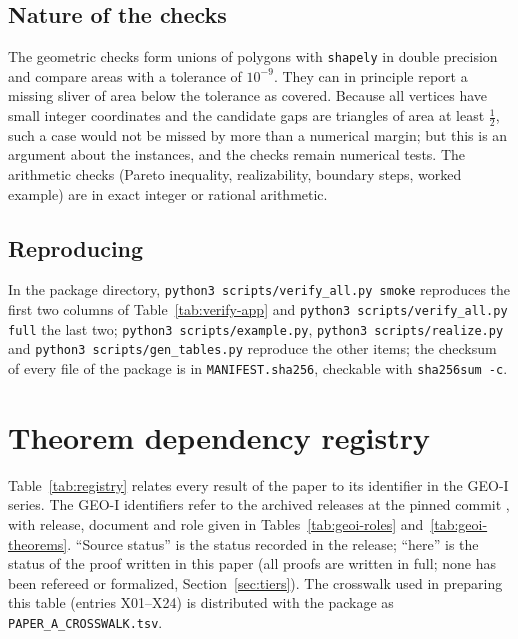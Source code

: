 \subsection{Nature of the checks}

The geometric checks form unions of polygons with \texttt{shapely} in double precision and compare areas with a tolerance of $10^{-9}$. They can in principle report a missing sliver of area below the tolerance as covered. Because all vertices have small integer coordinates and the candidate gaps are triangles of area at least $\tfrac12$, such a case would not be missed by more than a numerical margin; but this is an argument about the instances, and the checks remain numerical tests. The arithmetic checks (Pareto inequality, realizability, boundary steps, worked example) are in exact integer or rational arithmetic.

\subsection{Reproducing}

In the package directory, \texttt{python3 scripts/verify\_all.py smoke} reproduces the first two columns of Table~\ref{tab:verify-app} and \texttt{python3 scripts/verify\_all.py full} the last two; \texttt{python3 scripts/example.py}, \texttt{python3 scripts/realize.py} and \texttt{python3 scripts/gen\_tables.py} reproduce the other items; the checksum of every file of the package is in \texttt{MANIFEST.sha256}, checkable with \texttt{sha256sum -c}.

\section{Theorem dependency registry}\label{app:registry}

Table~\ref{tab:registry} relates every result of the paper to its identifier in the GEO-I series. The GEO-I identifiers refer to the archived releases at the pinned commit \geoicommit, with release, document and role given in Tables~\ref{tab:geoi-roles} and~\ref{tab:geoi-theorems}. ``Source status'' is the status recorded in the release; ``here'' is the status of the proof written in this paper (all proofs are written in full; none has been refereed or formalized, Section~\ref{sec:tiers}). The crosswalk used in preparing this table (entries X01--X24) is distributed with the package as \texttt{PAPER\_A\_CROSSWALK.tsv}.

